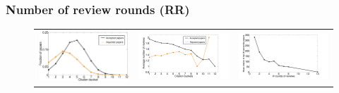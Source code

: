 \subsubsection{Number of review rounds (RR)}

 \begin{figure}[htpb]
 \centering
 \begin{tabular}{ccc}
 \includegraphics[scale=0.12]{./texfiles/Chapter_4/jcdl/figures/citation_bucket_frac_paper} & \includegraphics[scale=0.12]{./texfiles/Chapter_4/jcdl/figures/citation_bucket_reviews_all-eps-converted-to.pdf} & \includegraphics[scale=0.12]{./texfiles/Chapter_4/jcdl/figures/cit_rnd_rev-eps-converted-to.pdf}

\end{tabular}
\end{figure}
